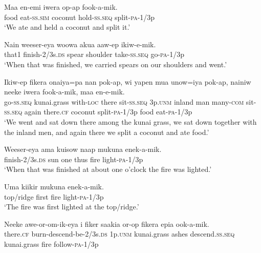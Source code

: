 \ea
\gll  Maa  en-emi  iwera  op-ap  fook-a-mik. \\
food  eat-\textsc{ss}.\textsc{sim}  coconut  hold-\textsc{ss.seq}  split-\textsc{pa}-1/3p \\
\glt ‘We ate and held a coconut and split it.’ \\
\z


\ea
\gll  Nain  weeser-eya  woowa  akua  aaw-ep  ikiw-e-mik. \\
that1  finish-2/3s.\textsc{ds}  spear  shoulder  take-\textsc{ss.seq}  go-\textsc{pa}-1/3p \\
\glt ‘When that was finished, we carried spears on our shoulders and went.’ \\
\z


\ea
\gll  Ikiw-ep  fikera  onaiya=pa  nan  pok-ap,  wi  yapen  mua            unow=iya  pok-ap,  nainiw  neeke  iwera  fook-a-mik,           maa  en-e-mik. \\
go-\textsc{ss.seq}  kunai.grass  with-\textsc{loc}  there  sit-\textsc{ss.seq}  3p.\textsc{unm}  inland  man  many-\textsc{com}  sit-\textsc{ss.seq}  again  there.\textsc{cf}  coconut  split-\textsc{pa}-1/3p  food  eat-\textsc{pa}-1/3p \\




\glt ‘We went and sat down there among the kunai grass, we sat down together with the inland men, and again there we split a coconut and ate food.’ \\
\z


\ea
\gll  Weeser-eya  ama  kuisow  naap  mukuna  enek-a-mik. \\
finish-2/3s.\textsc{ds}  sun  one  thus  fire  light-\textsc{pa}-1/3p \\
\glt ‘When that was finished at about one o’clock the fire was lighted.’ \\
\z


\ea
\gll  Uma  kiikir  mukuna  enek-a-mik. \\
top/ridge  first  fire  light-\textsc{pa}-1/3p \\
\glt ‘The fire was first lighted at the top/ridge.’ \\
\z


\ea
\gll  Neeke  awe-or-om-ik-eya  i  fiker  saakia                or-op  fikera  epia  ook-a-mik. \\
there.\textsc{cf}  burn-descend-be-2/3s.\textsc{ds}  1p.\textsc{unm}  kunai.grass  ashes  descend.\textsc{ss.seq}  kunai.grass  fire  follow-\textsc{pa}-1/3p \\


